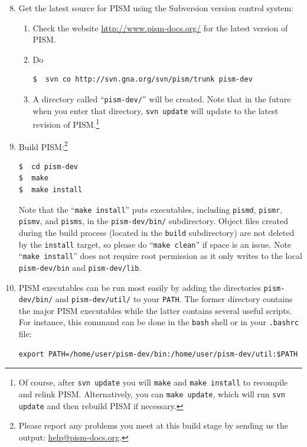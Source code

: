\documentclass[11pt,final]{amsart}
\renewcommand{\t}[1]{\texttt{#1}}
\begin{document}
\begin{enumerate}\setcounter{enumi}{7}
\item Get the latest source for PISM using the Subversion version control system:
\begin{enumerate}
\item \label{getPISMstep} Check the website \url{http://www.pism-docs.org/} for the latest version of PISM.
\item Do
\begin{verbatim}
$  svn co http://svn.gna.org/svn/pism/trunk pism-dev
\end{verbatim}
\item A directory called ``\verb|pism-dev/|'' will be created.  Note that in the future when you enter that directory, \verb|svn update| will update to the latest revision of PISM.\footnote{Of course, after \t{svn update} you will \t{make} and \t{make install} to recompile and relink PISM. Alternatively, you can \t{make update}, which will run \t{svn update} and then rebuild PISM if necessary.}
\end{enumerate}

\item Build PISM:\footnote{Please report any problems you meet at this build stage by sending us the output: \href{mailto:help@pism-docs.org}{help@pism-docs.org}.}
\begin{verbatim}
$  cd pism-dev
$  make
$  make install
\end{verbatim}
\noindent  Note that the ``\verb|make install|'' puts executables, including \verb|pismd|, \verb|pismr|, \verb|pismv|, and \verb|pisms|, in the \verb|pism-dev/bin/| subdirectory. Object files created during the build process (located in the \verb|build| subdirectory) are not deleted by the \verb|install| target, so please do ``\verb|make clean|'' if space is an issue. Note ``\verb|make install|'' does not require root permission as it only writes to the local \verb|pism-dev/bin| and \verb|pism-dev/lib|.

\item PISM executables can be run most easily by adding the directories \verb|pism-dev/bin/| and \verb|pism-dev/util/| to your \verb|PATH|.  The former directory contains the major PISM executables while the latter contains several useful scripts.  For instance, this command can be done in the \verb|bash| shell or in your \verb|.bashrc| file:
\begin{verbatim}
export PATH=/home/user/pism-dev/bin:/home/user/pism-dev/util:$PATH
\end{verbatim}
\end{enumerate}
\end{document}
